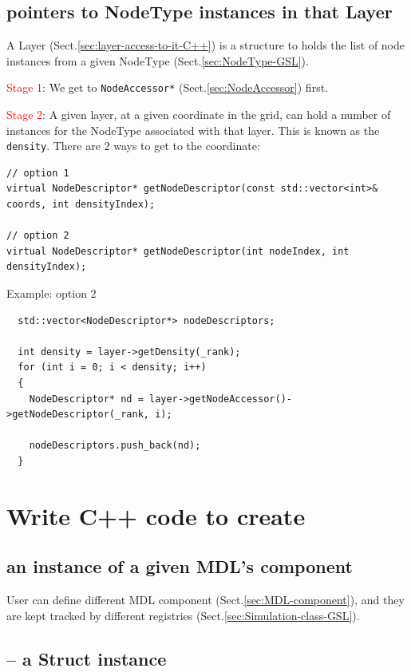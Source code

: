 \subsection{pointers to NodeType instances in that Layer}
\label{sec:NodeAccessor-access-to-it}

A Layer (Sect.\ref{sec:layer-access-to-it-C++}) is a structure to holds the list of node
instances from a given NodeType (Sect.\ref{sec:NodeType-GSL}).

\textcolor{red}{Stage 1}: We get to \verb!NodeAccessor*!
(Sect.\ref{sec:NodeAccessor}) first.

\textcolor{red}{Stage 2}: A given layer, at a given coordinate in the grid,
can hold a number of instances for the NodeType associated with that layer. This is known as the
\verb!density!. There are 2 ways to get to the coordinate:
\begin{verbatim}
// option 1
virtual NodeDescriptor* getNodeDescriptor(const std::vector<int>& coords, int densityIndex);

// option 2
virtual NodeDescriptor* getNodeDescriptor(int nodeIndex, int densityIndex);
\end{verbatim}

Example: option 2
\begin{verbatim}
  std::vector<NodeDescriptor*> nodeDescriptors;

  int density = layer->getDensity(_rank);
  for (int i = 0; i < density; i++)
  {
    NodeDescriptor* nd = layer->getNodeAccessor()->getNodeDescriptor(_rank, i);
  
    nodeDescriptors.push_back(nd);
  }

\end{verbatim}

\section{Write C++ code to create}

\subsection{an instance of a given MDL's component}	
\label{sec:ConstantType-create-instance}
\label{sec:StructType-create-instance}

User can define different MDL component (Sect.\ref{sec:MDL-component}), and they
are kept tracked by different registries (Sect.\ref{sec:Simulation-class-GSL}).


\subsection{-- a Struct instance}
\label{sec:create-Struct-C++}

